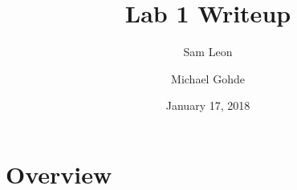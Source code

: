 \documentclass[12pt,letterpaper]{article}
\begin{document}
\title{Lab 1 Writeup}
\author{Sam Leon}
\author{Michael Gohde}
\date{January 17, 2018}
\maketitle

\section{Overview}
\end{document}
